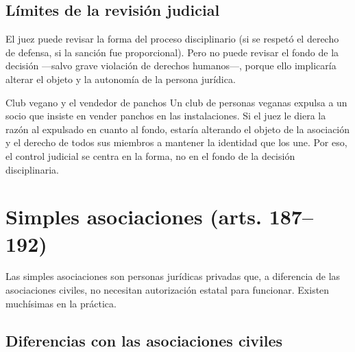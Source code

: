\documentclass[12pt,oneside]{book}
\begin{document}
\subsection{Límites de la revisión judicial}

El juez puede revisar la forma del proceso disciplinario (si se respetó el derecho de defensa, si la sanción fue proporcional). Pero no puede revisar el fondo de la decisión —salvo grave violación de derechos humanos—, porque ello implicaría alterar el objeto y la autonomía de la persona jurídica.

\begin{example}{Club vegano y el vendedor de panchos}
Un club de personas veganas expulsa a un socio que insiste en vender panchos en las instalaciones. Si el juez le diera la razón al expulsado en cuanto al fondo, estaría alterando el objeto de la asociación y el derecho de todos sus miembros a mantener la identidad que los une. Por eso, el control judicial se centra en la forma, no en el fondo de la decisión disciplinaria.
\end{example}

\section{Simples asociaciones (arts. 187--192)}

Las simples asociaciones son personas jurídicas privadas que, a diferencia de las asociaciones civiles, no necesitan autorización estatal para funcionar. Existen muchísimas en la práctica.

\subsection{Diferencias con las asociaciones civiles}
\end{document}
